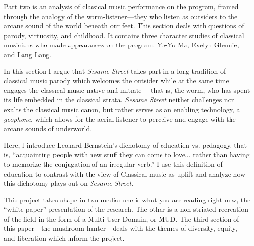\documentclass[12pt,letterpaper]{article}
\begin{document}
	Part two is an analysis of classical music performance on the program, 
	framed through the analogy of the worm-listener---they who listen as 
	outsiders to 
	the arcane sound of the world beneath our feet. This section deals with
	questions of parody, virtuosity, and childhood. It contains three
	character studies of classical musicians who made appearances on the
	program: Yo-Yo Ma, Evelyn Glennie, and Lang Lang.   

	
	In this section I argue that \textit{Sesame Street} takes part in a
	long tradition of classical music parody which welcomes the outsider
	while at the same time engages the classical music native and initiate
	---that is, the worm, who has spent its life embedded in the classical
	strata.
	\textit{Sesame Street} neither challenges nor exalts the classical 
	music canon, but rather serves as an enabling technology, a 
	\textit{geophone}, which allows for the aerial listener to perceive and
	engage with the arcane sounds of underworld.  
	
	Here, I introduce Leonard Bernstein's dichotomy of education vs.
	pedagogy, that is, ``acquainting people with 
	new stuff they can come to love... rather than having to memorize the 
	conjugation of an irregular verb.''\autocite[71]{Kopfstein} I use this
	definition of education to contrast with the view of Classical music as 
	uplift and analyze how this dichotomy plays out on \textit{Sesame
	Street}.  


	This project takes shape in two media: one is what you are reading 
	right now, the 
	``white paper'' presentation of the research. The other is a 
	non-striated recreation of the field in the form of a Multi User 
	Domain, or MUD. The third section of this paper---the mushroom 
	hunter---deals with the themes of diversity,
	equity, and liberation which inform the project.  
	
\end{document}
